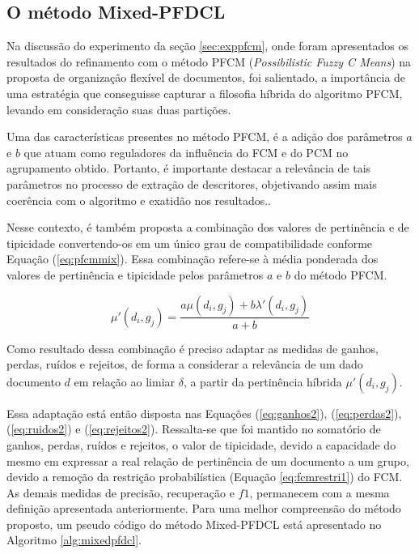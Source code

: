 \subsection{O método Mixed-PFDCL}

Na discussão do experimento da seção \ref{sec:exppfcm}, onde foram apresentados os resultados do
refinamento com o método PFCM ({\it Possibilistic Fuzzy C Means\/}) na proposta de organização
flexível de documentos, foi salientado, a importância de uma estratégia que conseguisse
capturar a filosofia híbrida do algoritmo PFCM, levando em consideração suas duas partições. 

Uma das características presentes no método PFCM, é a adição dos parâmetros $a$ e $b$ que atuam como
reguladores da influência do FCM e do PCM no agrupamento obtido. Portanto, é importante destacar a
relevância de tais parâmetros no processo de extração de descritores, objetivando
assim mais coerência com o algoritmo e exatidão nos resultados..

Nesse contexto, é também proposta a combinação dos valores de pertinência e de tipicidade
convertendo-os em um único grau de compatibilidade conforme Equação (\ref{eq:pfcmmix}). Essa
combinação refere-se à média ponderada dos valores de pertinência e tipicidade pelos parâmetros $a$
e $b$ do método PFCM.

\begin{equation}
  \mu'(d_i,g_j) = \frac{a \mu(d_i,g_j) + b \lambda'(d_i,g_j)}{a+b}
  \label{eq:pfcmmix}
\end{equation}

Como resultado dessa combinação é preciso adaptar as medidas de ganhos, perdas, ruídos e rejeitos,
de forma a considerar a relevância de um dado documento $d$ em relação ao limiar $\delta$, a partir
da pertinência híbrida $\mu'(d_i,g_j)$. 

Essa adaptação está então disposta nas Equações (\ref{eq:ganhos2}), (\ref{eq:perdas2}),
(\ref{eq:ruidos2}) e (\ref{eq:rejeitos2}). Ressalta-se que foi mantido no somatório de ganhos,
perdas, ruídos e rejeitos, o valor de tipicidade, devido a capacidade do mesmo em expressar a real
relação de pertinência de um documento a um grupo, devido a remoção da restrição probabilística
(Equação \ref{eq:fcmrestri1}) do
FCM. As demais medidas de precisão, recuperação e $f1$, permanecem com a mesma
definição apresentada anteriormente. Para uma melhor compreensão do método proposto, um pseudo
código do método Mixed-PFDCL está apresentado no Algoritmo \ref{alg:mixedpfdcl}.

